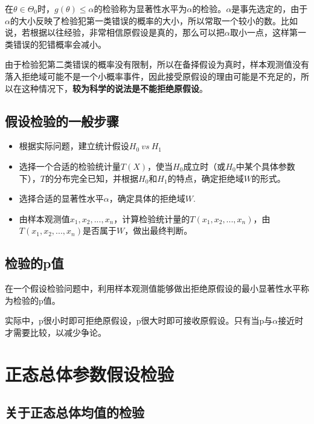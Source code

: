 \documentclass[
]{book}
\begin{document}
在\(\theta\in\Theta_0\)时，\(g(\theta)\leq\alpha\)的检验称为显著性水平为\(\alpha\)的检验。\(\alpha\)是事先选定的，由于\(\alpha\)的大小反映了检验犯第一类错误的概率的大小，所以常取一个较小的数。比如说，若根据以往经验，非常相信原假设是真的，那么可以把\(\alpha\)取小一点，这样第一类错误的犯错概率会减小。

由于检验犯第二类错误的概率没有限制，所以在备择假设为真时，样本观测值没有落入拒绝域可能不是一个小概率事件，因此接受原假设的理由可能是不充足的，所以在这种情况下，\textbf{较为科学的说法是不能拒绝原假设}。

\subsection{假设检验的一般步骤}\label{ux5047ux8bbeux68c0ux9a8cux7684ux4e00ux822cux6b65ux9aa4}

\begin{itemize}
\item
  根据实际问题，建立统计假设\(H_0\ vs\ H_1\)
\item
  选择一个合适的检验统计量\(T(X)\)，使当\(H_0\)成立时（或\(H_0\)中某个具体参数下），\(T\)的分布完全已知，并根据\(H_0\)和\(H_1\)的特点，确定拒绝域\(W\)的形式。
\item
  选择合适的显著性水平\(\alpha\)，确定具体的拒绝域\(W\).
\item
  由样本观测值\(x_1,x_2,...,x_n\)，计算检验统计量的\(T(x_1,x_2,...,x_n)\)，由\(T(x_1,x_2,...,x_n)\)是否属于\(W\)，做出最终判断。
\end{itemize}

\subsection{检验的p值}\label{ux68c0ux9a8cux7684pux503c}

在一个假设检验问题中，利用样本观测值能够做出拒绝原假设的最小显著性水平称为检验的p值。

实际中，p很小时即可拒绝原假设，p很大时即可接收原假设。只有当p与\(\alpha\)接近时才需要比较，以减少争论。

\section{正态总体参数假设检验}\label{ux6b63ux6001ux603bux4f53ux53c2ux6570ux5047ux8bbeux68c0ux9a8c}

\subsection{关于正态总体均值的检验}\label{ux5173ux4e8eux6b63ux6001ux603bux4f53ux5747ux503cux7684ux68c0ux9a8c}
\end{document}
